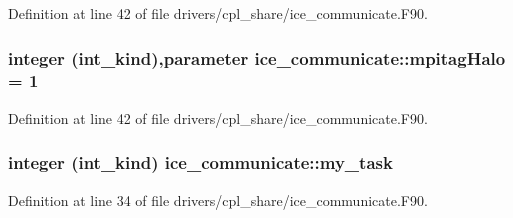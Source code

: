 Definition at line 42 of file drivers/cpl\_\-share/ice\_\-communicate.F90.\hypertarget{namespaceice__communicate_abf79852ee48a5d30f16dffad09f5b9e1}{
\subsubsection[{mpitagHalo}]{\setlength{\rightskip}{0pt plus 5cm}integer (int\_\-kind),parameter {\bf ice\_\-communicate::mpitagHalo} = 1}}
\label{namespaceice__communicate_abf79852ee48a5d30f16dffad09f5b9e1}


Definition at line 42 of file drivers/cpl\_\-share/ice\_\-communicate.F90.\hypertarget{namespaceice__communicate_a70e729e746e2e5ec592ccba505136002}{
\subsubsection[{my\_\-task}]{\setlength{\rightskip}{0pt plus 5cm}integer (int\_\-kind) {\bf ice\_\-communicate::my\_\-task}}}
\label{namespaceice__communicate_a70e729e746e2e5ec592ccba505136002}


Definition at line 34 of file drivers/cpl\_\-share/ice\_\-communicate.F90.